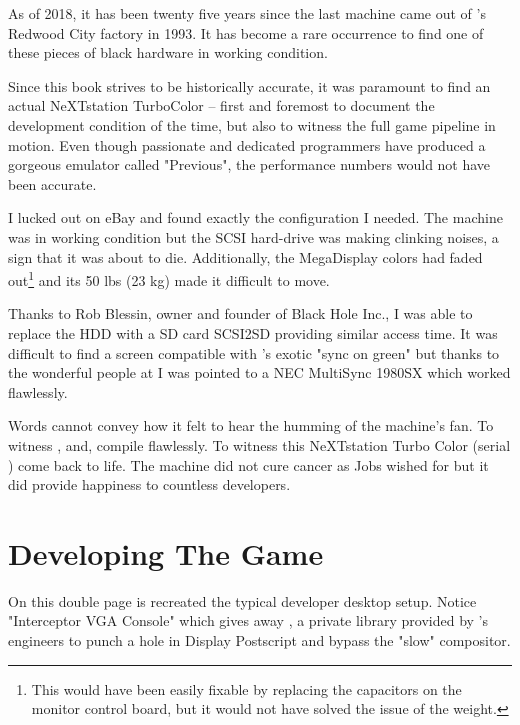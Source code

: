  As of 2018, it has been twenty five years since the last machine came out of \NeXT{}'s Redwood City factory in 1993. It has become a rare occurrence to find one of these pieces of black hardware in working condition.\\
 \par
 Since this book strives to be historically accurate, it was paramount to find an actual NeXTstation TurboColor -- first and foremost to document the development condition of the time, but also to witness the full game pipeline in motion. Even though passionate and dedicated programmers have produced a gorgeous emulator called "Previous", the performance numbers would not have been accurate.\\
 \par
  I lucked out on eBay and found exactly the configuration I needed. The machine was in working condition but the SCSI hard-drive was making clinking noises, a sign that it was about to die. Additionally, the MegaDisplay colors had faded out\footnote{This would have been easily fixable by replacing the capacitors on the monitor control board, but it would not have solved the issue of the weight.} and its 50 lbs (23 kg) made it difficult to move.\\
  \par
  Thanks to Rob Blessin, owner and founder of Black Hole Inc., I was able to replace the HDD with a SD card SCSI2SD providing similar access time. It was difficult to find a screen compatible with \NeXTns{}'s exotic "sync on green" but thanks to the wonderful people at  I was pointed to a NEC MultiSync 1980SX which worked flawlessly.\\
  \par
  Words cannot convey how it felt to hear the humming of the machine's fan. To witness ,  and,  compile flawlessly. To witness this NeXTstation Turbo Color (serial ) come back to life. The machine did not cure cancer as Jobs wished for but it did provide happiness to countless developers.





\section{Developing The Game}
On this double page is recreated the typical developer desktop setup. Notice "Interceptor VGA Console" which gives away , a private library provided by \NeXTns's engineers to punch a hole in Display Postscript and bypass the "slow" compositor.\\
\par
{}

